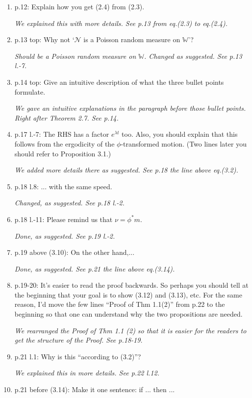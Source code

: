 \documentclass[12pt,a4paper]{amsart}
\numberwithin{equation}{section}
\theoremstyle{plain}
\theoremstyle{definition}
\begin{document}
\begin{enumerate}
  {\it Should always use $\alpha$.
     We changed several $\gamma$ into $\alpha$ in Subsection 2.2.}
\item
  p.12: Explain how you get (2.4) from (2.3). 

  {\it We explained this with more details. See p.13 from eq.(2.3) to eq.(2.4). }
\item
  p.13 top: Why not `$\mathcal N$ is a Poisson random measure on $\mathbb W$'?

  {\it Should be a Poisson random measure on $\mathbb W$. Changed as suggested. See p.13 l.-7.}
\item
  p.14 top: Give an intuitive description of what the three bullet points formulate.

  {\it We gave an intuitive explanations in the paragraph before those bullet points. Right after Theorem 2.7. See p.14. }
\item
  p.17 l.-7: The RHS has a factor $e^{\lambda t}$ too.
  Also, you should explain that this follows from the ergodicity of the $\phi$-transformed motion.
  (Two lines later you should refer to Proposition 3.1.)

  {\it We added more details there as suggested. See p.18 the line above eq.(3.2).}
\item
  p.18 l.8: ... with the same speed.

  {\it Changed, as suggested. See p.18 l.-2.}
\item
  p.18 l.-11: Please remind us that $\nu = \phi^* m$.

  {\it Done, as suggested. See p.19 l.-2.}
\item
  p.19 above (3.10): On the other hand,...

  {\it Done, as suggested. See p.21 the line above eq.(3.14).}
\item
  p.19-20: It's easier to read the proof backwards. So perhaps you should tell at the beginning that your goal is to show (3.12) and (3.13), etc.
  For the same reason, I'd move the few lines ``Proof of Thm 1.1(2)'' from p.22 to the beginning so that one can understand why the two propositions are needed.

  {\it We rearranged the Proof of Thm 1.1 (2) so that it is easier for the readers to get the structure of the Proof. See p.18-19. }
\item
  p.21 l.1: Why is this ``according to (3.2)''?

  {\it We explained this in more details. See p.22 l.12.}
\item
  p.21 before (3.14): Make it one sentence: if ... then ...


\end{enumerate}
\end{document}
